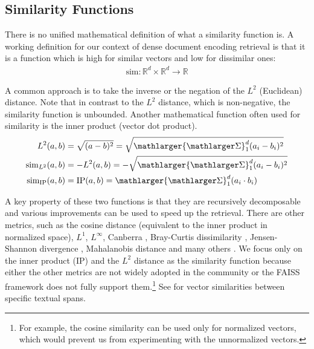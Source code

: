 \subsection{Similarity Functions}

There is no unified mathematical definition of what a similarity function is.
A working definition for our context of dense document encoding retrieval is that it is a function which is high for similar vectors and low for dissimilar ones:
\begin{gather*}
    \text{sim}: \mathbb{R}^d \times \mathbb{R}^d \rightarrow \mathbb{R}
\end{gather*}

A common approach is to take the inverse or the negation of the $L^2$ (Euclidean) distance.
Note that in contrast to the $L^2$ distance, which is non-negative, the similarity function is unbounded.
Another mathematical function often used for similarity is the inner product (vector dot product).
\begin{align*}
    L^2(a,b)                  & = \sqrt{(a-b)^2} = \sqrt{{\mathlarger{\mathlarger\Sigma}}^d_1 (a_i-b_i)^2} \\
    \text{sim}_{L^2}(a,b)     & = -L^2(a,b) = -\sqrt{{\mathlarger{\mathlarger\Sigma}}^d_1 (a_i-b_i)^2}     \\
    \text{sim}_\text{IP}(a,b) & = \text{IP}(a,b) = {\mathlarger{\mathlarger\Sigma}}^d_1 (a_i\cdot b_i)
\end{align*}

A key property of these two functions is that they are recursively decomposable \citep{JDH17} and various improvements can be used to speed up the retrieval.
There are other metrics, such as the cosine distance (equivalent to the inner product in normalized space), $L^1$, $L^\infty$, Canberra \citep{lance1966computer}, Bray-Curtis dissimilarity \citep{thakur2019analysis}, Jensen-Shannon divergence \citep{lin1991divergence}, Mahalanobis distance \citep{mahalanobis1936generalized} and many others \citep{vijaymeena2016survey,joshi2019dissimilarity,sitikhu2019comparison}.
We focus only on the inner product (IP) and the $L^2$ distance as the similarity function because either the other metrics are not widely adopted in the community or the FAISS framework does not fully support them.\footnote{For example, the cosine similarity can be used only for normalized vectors, which would prevent us from experimenting with the unnormalized vectors.}
See  for vector similarities between specific textual spans.

